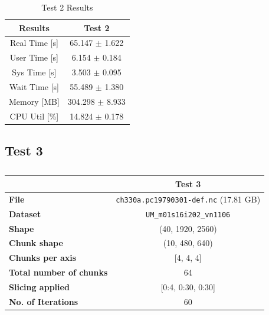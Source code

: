 \documentclass{article}
\begin{document}
\begin{table}[h!]
    \centering
    \begin{tabular}{cc}
        \hline
        \textbf{Results} & Test 2              \\ \hline
        Real Time [s]    & 65.147 $\pm$ 1.622  \\
        User Time [s]    & 6.154  $\pm$ 0.184  \\
        Sys Time [s]     & 3.503  $\pm$ 0.095  \\
        Wait Time [s]    & 55.489 $\pm$ 1.380  \\
        Memory [MB]      & 304.298 $\pm$ 8.933 \\
        CPU Util [\%]    & 14.824 $\pm$ 0.178  \\
        \hline
    \end{tabular}
    \caption{Test 2 Results}
    \label{tab:T2_Results}
\end{table}

\break
\subsection{Test 3}

\begin{table}[h!] 
    \centering 
    \begin{tabular}{lc}  \hline
                                        & Test 3                                          \\ \hline
        \textbf{File}                   & \texttt{ch330a.pc19790301-def.nc} (17.81  GB)   \\  
        \textbf{Dataset}                &  \texttt{UM\_m01s16i202\_vn1106}  \\ 
        \textbf{Shape}                  &  (40, 1920, 2560)                 \\ 
        \textbf{Chunk shape}            &  (10, 480, 640)                   \\ 
        \textbf{Chunks per axis}        &  [4, 4, 4]                        \\ 
        \textbf{Total number of chunks} &  64                               \\ 
        \textbf{Slicing applied}        &  [0:4, 0:30, 0:30]                \\ 
        \textbf{No. of Iterations}      &  60                               \\  \hline
    \end{tabular} 
    \caption{} 
    \label{tab:T3_Conditions} 
\end{table}
\end{document}
